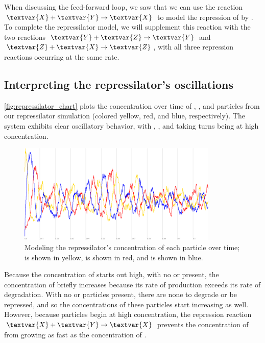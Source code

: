 When discussing the feed-forward loop, we saw that we can use the reaction $\textvar{X} + \textvar{Y} \rightarrow \textvar{X}$ to model the repression of  by . To complete the repressilator model, we will supplement this reaction with the two reactions $\textvar{Y} + \textvar{Z} \rightarrow \textvar{Y}$ and $\textvar{Z} + \textvar{X} \rightarrow \textvar{Z}$, with all three repression reactions occurring at the same rate.

\FloatBarrier
{}
\subsection{Interpreting the repressilator's oscillations}

\autoref{fig:repressilator_chart} plots the concentration over time of , , and  particles from our repressilator simulation (colored yellow, red, and blue, respectively). The system exhibits clear oscillatory behavior, with , , and  taking turns being at high concentration.\\

\begin{qbox}\end{qbox}

\begin{figure}[h]
\centering
\mySfFamily
\includegraphics[width = 0.85\textwidth]{../images/cellblender_repressilator_white.png}
\caption{Modeling the repressilator's concentration of each particle over time;  is shown in yellow,  is shown in red, and  is shown in blue.}
\label{fig:repressilator_chart}
\end{figure}

Because the concentration of  starts out high, with no  or  present, the concentration of  briefly increases because its rate of production exceeds its rate of degradation. With no  or  particles present, there are none to degrade or be repressed, and so the concentrations of these particles start increasing as well. However, because  particles begin at high concentration, the repression reaction $\textvar{X} + \textvar{Y} \rightarrow \textvar{X}$ prevents the concentration of  from growing as fast as the concentration of .

